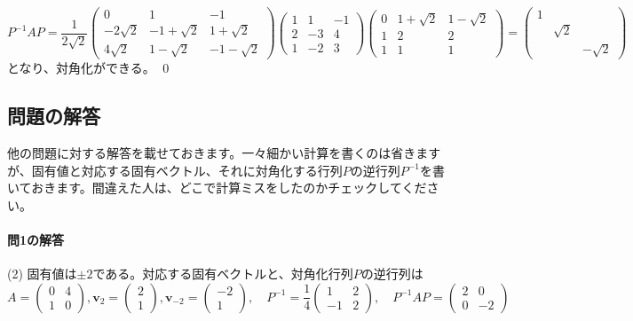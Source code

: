\[
P^{-1} A P 
=
\frac{1}{2\sqrt{2}}
\begin{pmatrix}
0 & 1 & -1 \\
-2\sqrt{2} & -1 + \sqrt{2} & 1 + \sqrt{2} \\
4\sqrt{2} & 1 - \sqrt{2} & -1 - \sqrt{2}
\end{pmatrix}
\begin{pmatrix}
1 & 1 & -1 \\
2 & -3 & 4 \\
1 & -2 & 3
\end{pmatrix}
\begin{pmatrix}
0 & 1 + \sqrt{2} & 1 - \sqrt{2} \\
1 & 2 & 2 \\
1 & 1 & 1
\end{pmatrix}
=
\begin{pmatrix}
1 \\
& \sqrt{2} \\
& & -\sqrt{2}
\end{pmatrix}
\]
となり、対角化ができる。 \qed

\subsection{問題の解答}

他の問題に対する解答を載せておきます。一々細かい計算を書くのは省きますが、固有値と対応する固有ベクトル、それに対角化する行列$P$の逆行列$P^{-1}$を書いておきます。間違えた人は、どこで計算ミスをしたのかチェックしてください。

\paragraph{問1の解答} (2) 固有値は$\pm2$である。対応する固有ベクトルと、対角化行列$P$の逆行列は
\[
A =
\begin{pmatrix}
0 & 4 \\
1 & 0
\end{pmatrix}, 
\bm{v}_2 = 
\begin{pmatrix}
2 \\
1
\end{pmatrix}, 
\bm{v}_{-2} = 
\begin{pmatrix}
-2 \\
1
\end{pmatrix}, \quad
P^{-1} = 
\frac{1}{4}
\begin{pmatrix}
1 & 2 \\
-1 & 2
\end{pmatrix}, \quad
P^{-1} AP =
\begin{pmatrix}
2 & 0 \\
0 & -2
\end{pmatrix}
\]

